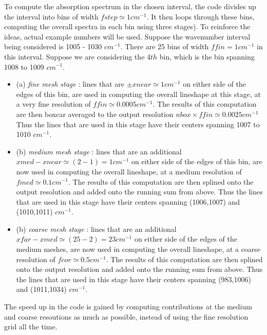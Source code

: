\documentclass[11pt]{article}
\begin{document}
To compute the absorption 
spectrum in the chosen interval, the code divides up the interval into 
bins of width $fstep \simeq 1 cm^{-1}$.  It then loops through these bins, 
computing the overall spectra in each bin using three stages). To reinforce
the ideas, actual example numbers will be used. Suppose the wavenumber
interval being considered is 1005 - 1030 $cm^{-1}$. There are 25 bins of
width $ffin = 1 cm^{-1}$ in this interval. Suppose we are considering the
4$th$ bin, which is the bin spanning 1008 to 1009 $cm^{-1}$.
\begin{itemize}
\item (a) {\it fine mesh stage} : lines that are $\pm xnear \simeq 1cm^{-1}$
          on either side of the edges of this bin, are used in computing 
          the overall lineshape at this stage, at a very fine resolution of 
          $ffin \simeq 0.0005 cm^{-1}$. The results of this computation 
          are then boxcar averaged to the output resolution $nbox \times 
          ffin \simeq 0.0025 cm^{-1}$ \\
          Thus the lines that are used in this stage have their centers 
          spanning 1007 to 1010 $cm^{-1}$.

\item (b) {\it medium mesh stage} : lines that are an additional 
          $xmed - xnear \simeq (2 - 1) = 1 cm^{-1}$ on either side of the 
          edges of this bin, are now used in computing 
          the overall lineshape, at a medium resolution of 
          $fmed \simeq 0.1 cm^{-1}$. The results of this computation 
          are then splined onto the output resolution and added onto the
          running sum from above.
          Thus the lines that are used in this stage have their centers 
          spanning (1006,1007) and (1010,1011) $cm^{-1}$.

\item (b) {\it coarse mesh stage} : lines that are an additional 
          $xfar - xmed \simeq (25 - 2) = 23 cm^{-1}$ on either side of the 
          edges of the medium meshes, are now used in computing 
          the overall lineshape, at a coarse resolution of 
          $fcor \simeq 0.5 cm^{-1}$. The results of this computation 
          are then splined onto the output resolution and added onto the
          running sum from above.
          Thus the lines that are used in this stage have their centers 
          spanning (983,1006) and (1011,1034) $cm^{-1}$.
\end{itemize}

The speed up in the code is gained by computing contributions at the 
medium and coarse resoutions as much as possible, instead of using the 
fine resolution grid all the time.
\end{document}
